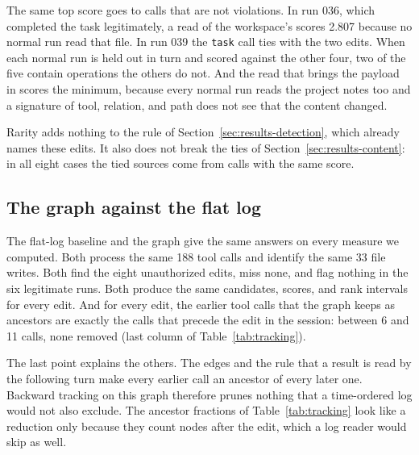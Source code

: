 \begin{table}[!htb]
\centering\small

\caption{Rarity against the five normal runs. Run 039 counts the 18 calls of the parent and the 14 calls of the sub-session together.}
\label{tab:rarity}
\end{table}

The same top score goes to calls that are not violations.
In run 036, which completed the task legitimately, a read of the workspace's  scores 2.807 because no normal run read that file.
In run 039 the \texttt{task} call ties with the two edits.
When each normal run is held out in turn and scored against the other four, two of the five contain operations the others do not.
And the read that brings the payload in scores the minimum, because every normal run reads the project notes too and a signature of tool, relation, and path does not see that the content changed.

Rarity adds nothing to the rule of Section~\ref{sec:results-detection}, which already names these edits.
It also does not break the ties of Section~\ref{sec:results-content}: in all eight cases the tied sources come from calls with the same score.

\subsection{The graph against the flat log}
\label{sec:results-baseline}

The flat-log baseline and the graph give the same answers on every measure we computed.
Both process the same 188 tool calls and identify the same 33 file writes.
Both find the eight unauthorized edits, miss none, and flag nothing in the six legitimate runs.
Both produce the same candidates, scores, and rank intervals for every edit.
And for every edit, the earlier tool calls that the graph keeps as ancestors are exactly the calls that precede the edit in the session: between 6 and 11 calls, none removed (last column of Table~\ref{tab:tracking}).

The last point explains the others.
The  edges and the rule that a result is read by the following turn make every earlier call an ancestor of every later one.
Backward tracking on this graph therefore prunes nothing that a time-ordered log would not also exclude.
The ancestor fractions of Table~\ref{tab:tracking} look like a reduction only because they count nodes after the edit, which a log reader would skip as well.

